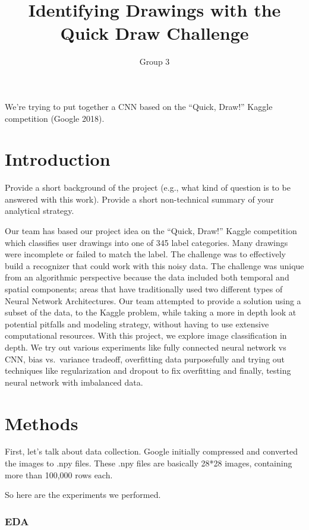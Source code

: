 \documentclass[]{article}
\title{Identifying Drawings with the Quick Draw Challenge}
\author{Group 3}
\date{}
\begin{document}
\maketitle

We're trying to put together a CNN based on the ``Quick, Draw!'' Kaggle
competition (Google 2018).

\section{Introduction}\label{introduction}

Provide a short background of the project (e.g., what kind of question
is to be answered with this work). Provide a short non-technical summary
of your analytical strategy.

Our team has based our project idea on the ``Quick, Draw!'' Kaggle
competition which classifies user drawings into one of 345 label
categories. Many drawings were incomplete or failed to match the label.
The challenge was to effectively build a recognizer that could work with
this noisy data. The challenge was unique from an algorithmic
perspective because the data included both temporal and spatial
components; areas that have traditionally used two different types of
Neural Network Architectures. Our team attempted to provide a solution
using a subset of the data, to the Kaggle problem, while taking a more
in depth look at potential pitfalls and modeling strategy, without
having to use extensive computational resources. With this project, we
explore image classification in depth. We try out various experiments
like fully connected neural network vs CNN, bias vs.~variance tradeoff,
overfitting data purposefully and trying out techniques like
regularization and dropout to fix overfitting and finally, testing
neural network with imbalanced data.

\section{Methods}\label{methods}

First, let's talk about data collection. Google initially compressed and
converted the images to .npy files. These .npy files are basically 28*28
images, containing more than 100,000 rows each.

So here are the experiments we performed.

\subsubsection{EDA}\label{eda}
\end{document}

